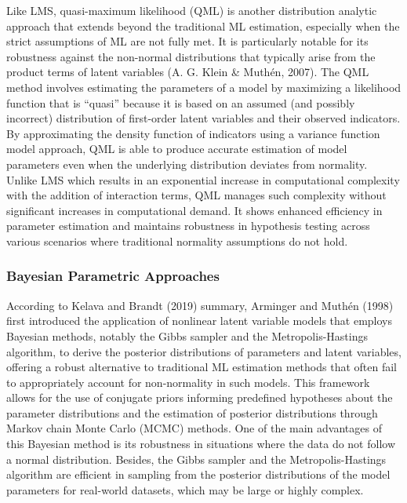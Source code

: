 \documentclass[
  man]{apa6}
\begin{document}
Like LMS, quasi-maximum likelihood (QML) is another distribution analytic approach that extends beyond the traditional ML estimation, especially when the strict assumptions of ML are not fully met. It is particularly notable for its robustness against the non-normal distributions that typically arise from the product terms of latent variables (A. G. Klein \& Muthén, 2007). The QML method involves estimating the parameters of a model by maximizing a likelihood function that is ``quasi'' because it is based on an assumed (and possibly incorrect) distribution of first-order latent variables and their observed indicators. By approximating the density function of indicators using a variance function model approach, QML is able to produce accurate estimation of model parameters even when the underlying distribution deviates from normality. Unlike LMS which results in an exponential increase in computational complexity with the addition of interaction terms, QML manages such complexity without significant increases in computational demand. It shows enhanced efficiency in parameter estimation and maintains robustness in hypothesis testing across various scenarios where traditional normality assumptions do not hold.

\hypertarget{bayesian-parametric-approaches}{%
\subsubsection{Bayesian Parametric Approaches}\label{bayesian-parametric-approaches}}

According to Kelava and Brandt (2019) summary, Arminger and Muthén (1998) first introduced the application of nonlinear latent variable models that employs Bayesian methods, notably the Gibbs sampler and the Metropolis-Hastings algorithm, to derive the posterior distributions of parameters and latent variables, offering a robust alternative to traditional ML estimation methods that often fail to appropriately account for non-normality in such models. This framework allows for the use of conjugate priors informing predefined hypotheses about the parameter distributions and the estimation of posterior distributions through Markov chain Monte Carlo (MCMC) methods. One of the main advantages of this Bayesian method is its robustness in situations where the data do not follow a normal distribution. Besides, the Gibbs sampler and the Metropolis-Hastings algorithm are efficient in sampling from the posterior distributions of the model parameters for real-world datasets, which may be large or highly complex.
\end{document}

